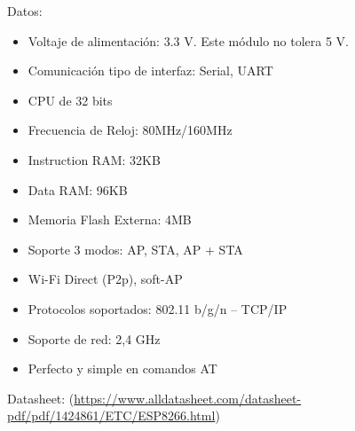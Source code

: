         Datos:\par
        
        \begin{itemize}[label=•]
            \setlength{\itemindent}{2em}
            
            \item Voltaje de alimentación: 3.3 V. Este módulo no tolera 5 V.\par
            \item Comunicación tipo de interfaz: Serial, UART\par
            \item CPU de 32 bits\par
            \item Frecuencia de Reloj: 80MHz/160MHz\par
           \item Instruction RAM: 32KB\par
            \item Data RAM: 96KB\par
            \item Memoria Flash Externa: 4MB\par
            \item Soporte 3 modos: AP, STA, AP + STA\par
            \item Wi-Fi Direct (P2p), soft-AP\par
            \item Protocolos soportados: 802.11 b/g/n –  TCP/IP\par
            \item Soporte de red: 2,4 GHz\par
            \item Perfecto y simple en comandos AT\par
        \end{itemize}
            
        Datasheet: (\href{https://www.alldatasheet.com/datasheet-pdf/pdf/1424861/ETC/ESP8266.html}{https://www.alldatasheet.com/datasheet-pdf/pdf/1424861/ETC/ESP8266.html})\par